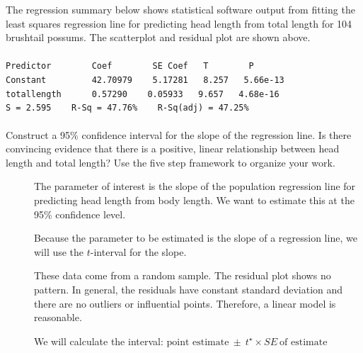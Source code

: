 \begin{examplewrap}
\begin{nexample}{


The regression summary below shows statistical software output from fitting the least squares regression line for predicting head length from total length for 104 brushtail possums.  The scatterplot and residual plot are shown above. 
\\
\\
\texttt{Predictor \ \ \ \ \ \ \ Coef \ \ \ \ \ \ \ SE Coef \ \ T \ \ \ \ \ \ \ P} \\
\texttt{Constant \ \ \ \ \ \ \ \  42.70979 \ \ \ 5.17281 \ \ 8.257 \ \ 5.66e-13} \\
\texttt{total\us{}length\ \ \ \ \ \ 0.57290 \ \ \ 0.05933 \ \ 9.657 \ \ 4.68e-16} \\

\texttt{S = 2.595\ \ \ \ R-Sq = 47.76\% \ \ \ R-Sq(adj) = 47.25\%}
\\
\\
Construct a 95\% confidence interval for the slope of the regression line.  Is there convincing evidence that there is a positive, linear relationship between head length and total length? Use the five step framework to organize your work.}
\begin{description}
\item[] The parameter of interest is the slope of the population regression line for predicting head length from body length.  We want to estimate this at the 95\% confidence level.  
\item[] Because the parameter to be estimated is the slope of a regression line, we will use the $t$-interval for the slope.
\item[] These data come from a random sample.  The residual plot shows no pattern.  In general, the residuals have constant standard deviation and there are no outliers or influential points.  Therefore, a linear model is reasonable.
\item[]  We will calculate the interval:
$\text{point estimate}\ \pm\ t^{\star} \times SE\ \text{of estimate}$


\end{description}
\end{nexample}
\end{examplewrap}
